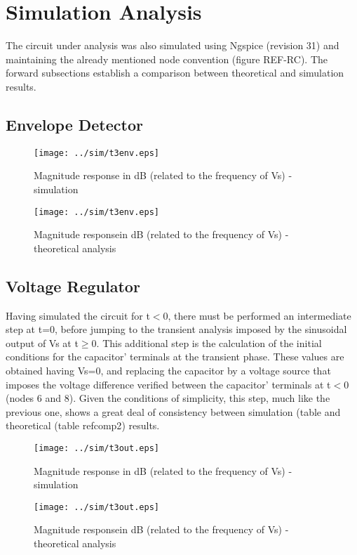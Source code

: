 \section{Simulation Analysis}
\label{sec:simulation}

The circuit under analysis was also simulated using Ngspice (revision 31) and maintaining the already mentioned node convention (figure REF-RC). The forward subsections establish a comparison between theoretical and simulation results.

\subsection{Envelope Detector}




\begin{figure}[h] \centering
  \begin{minipage}{.5\textwidth}
    \texttt{[image: ../sim/t3env.eps]}
    \caption{Magnitude response in dB (related to the frequency of Vs) - simulation}
    \label{fig:simenv}
    \end{minipage}%
  \begin{minipage}{.5\textwidth}
  \centering
    \texttt{[image: ../sim/t3env.eps]}
    \caption{Magnitude responsein dB (related to the frequency of Vs) - theoretical analysis }
    \label{fig:compenv}
      \end{minipage}%
\end{figure}

\subsection{Voltage Regulator}

Having simulated the circuit for t$<$0, there must be performed an intermediate step at t=0, before jumping to the transient analysis imposed by the sinusoidal output of Vs at t$\geq$0. This additional step is the calculation of the initial conditions for the capacitor' terminals at the transient phase. These values are obtained having Vs=0, and replacing the capacitor by a voltage source that imposes the voltage difference verified between the capacitor' terminals at t$<$0 (nodes 6 and 8). Given the conditions of simplicity, this step, much like the previous one, shows a great deal of consistency between simulation (table  and theoretical (table ref{comp2}) results. 




\begin{figure}[h] \centering
  \begin{minipage}{.5\textwidth}
    \texttt{[image: ../sim/t3out.eps]}
    \caption{Magnitude response in dB (related to the frequency of Vs) - simulation}
    \label{fig:simout}
    \end{minipage}%
  \begin{minipage}{.5\textwidth}
  \centering
    \texttt{[image: ../sim/t3out.eps]}
    \caption{Magnitude responsein dB (related to the frequency of Vs) - theoretical analysis }
    \label{fig:compout}
      \end{minipage}%
\end{figure}

